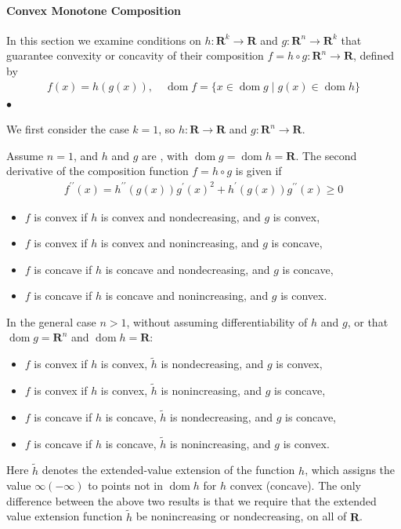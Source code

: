 \documentclass{article}
\newcommand{\dom}{\operatorname{dom}}
\begin{document}
\paragraph{Convex Monotone Composition}
In this section we examine conditions on $h: \mathbf{R}^{k} \rightarrow \mathbf{R}$ and $g: \mathbf{R}^{n} \rightarrow \mathbf{R}^{k}$ that guarantee convexity or concavity of their composition $f=h \circ g: \mathbf{R}^{n} \rightarrow \mathbf{R}$, defined by
\begin{align*}
f(x)=h(g(x)), \quad \dom  f=\{x \in \dom  g \mid g(x) \in \dom  h\}
\end{align*}
$\bullet$ 

We first consider the case $k=1$, so $h: \mathbf{R} \rightarrow \mathbf{R}$ and $g: \mathbf{R}^{n} \rightarrow \mathbf{R} .$ 

Assume $n=1$, and $h$ and $g$ are , with $\dom  g=\dom  h=\mathbf{R}$. 
The second derivative of the composition function $f=h \circ g$ is given if
\begin{align*}
f^{\prime \prime}(x)=h^{\prime \prime}(g(x)) g^{\prime}(x)^{2}+h^{\prime}(g(x)) g^{\prime \prime}(x)\ge 0
\end{align*}
\begin{itemize}
    \item $f$ is convex if $h$ is convex and nondecreasing, and $g$ is convex,
    \item  $f$ is convex if $h$ is convex and nonincreasing, and $g$ is concave,
    \item $f$ is concave if $h$ is concave and nondecreasing, and $g$ is concave,
    \item $f$ is concave if $h$ is concave and nonincreasing, and $g$ is convex.
\end{itemize}
In the general case $n>1$, without assuming differentiability of $h$ and $g$, or that $\dom  g=\mathbf{R}^{n}$ and $\dom  h=\mathbf{R}$:
\begin{itemize}
    \item $f$ is convex if $h$ is convex, $\tilde{h}$ is nondecreasing, and $g$ is convex,
    \item  $f$ is convex if $h$ is convex, $\tilde{h}$ is nonincreasing, and $g$ is concave, 
    \item $f$ is concave if $h$ is concave, $\tilde{h}$ is nondecreasing, and $g$ is concave,
    \item $f$ is concave if $h$ is concave, $\tilde{h}$ is nonincreasing, and $g$ is convex.
\end{itemize}
Here $\tilde{h}$ denotes the extended-value extension of the function $h$, which assigns the value $\infty(-\infty)$ to points not in $\dom  h$ for $h$ convex (concave). The only difference between the above two results is that we require that the extended value extension function $\tilde{h}$ be nonincreasing or nondecreasing, on all of $\mathbf{R}$.
\end{document}
